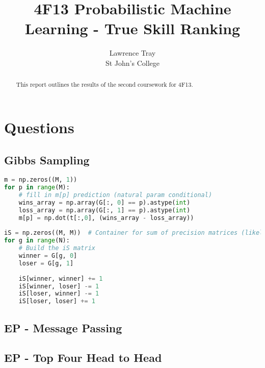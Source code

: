 \documentclass[]{article}
\title{4F13 Probabilistic Machine Learning - True Skill Ranking}
\author{Lawrence Tray \\ St John's College}
\begin{document}


\setcounter{page}{1}
\maketitle

\begin{abstract}
This report outlines the results of the second coursework for 4F13. 
\end{abstract}

\tableofcontents

\section{Questions}
\subsection{Gibbs Sampling}

\begin{lstlisting}[frame=single, caption={Gibbs sampling additions}, label={lst:gibbs}, language={python}]
m = np.zeros((M, 1))
for p in range(M):
	# fill in m[p] prediction (natural param conditional)
	wins_array = np.array(G[:, 0] == p).astype(int)
	loss_array = np.array(G[:, 1] == p).astype(int)
	m[p] = np.dot(t[:,0], (wins_array - loss_array))
	
iS = np.zeros((M, M))  # Container for sum of precision matrices (likelihood terms)
for g in range(N):
	# Build the iS matrix
	winner = G[g, 0]
	loser = G[g, 1]
	
	iS[winner, winner] += 1
	iS[winner, loser] -= 1
	iS[loser, winner] -= 1
	iS[loser, loser] += 1
\end{lstlisting}

\subsection{EP - Message Passing}


\subsection{EP - Top Four Head to Head}
\end{document}

